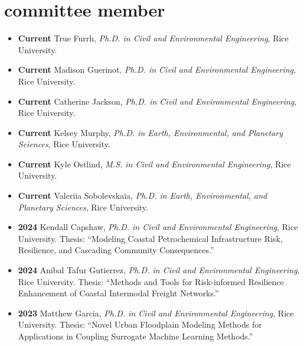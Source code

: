 \documentclass[10pt,oneside]{article}
\begin{document}
\section{committee member}

\mbox{}\vspace{-\dimexpr\baselineskip\relax}

\begin{itemize}[label={}]

  
    \item \textbf{Current} True Furrh, \textit{Ph.D. in Civil and Environmental Engineering}, Rice University. 
  
    \item \textbf{Current} Madison Guerinot, \textit{Ph.D. in Civil and Environmental Engineering}, Rice University. 
  
    \item \textbf{Current} Catherine Jackson, \textit{Ph.D. in Civil and Environmental Engineering}, Rice University. 
  
    \item \textbf{Current} Kelsey Murphy, \textit{Ph.D. in Earth, Environmental, and Planetary Sciences}, Rice University. 
  
    \item \textbf{Current} Kyle Ostlind, \textit{M.S. in Civil and Environmental Engineering}, Rice University. 
  
    \item \textbf{Current} Valeriia Sobolevskaia, \textit{Ph.D. in Earth, Environmental, and Planetary Sciences}, Rice University. 
  
  
  
    \item \textbf{2024} \quad Kendall Capshaw, \textit{Ph.D. in Civil and Environmental Engineering}, Rice University. Thesis: \enquote{Modeling Coastal Petrochemical Infrastructure Risk, Resilience, and Cascading Community Consequences.}
  
    \item \textbf{2024} \quad Anibal Tafur Gutierrez, \textit{Ph.D. in Civil and Environmental Engineering}, Rice University. Thesis: \enquote{Methods and Tools for Risk-informed Resilience Enhancement of Coastal Intermodal Freight Networks.}
  
    \item \textbf{2023} \quad Matthew Garcia, \textit{Ph.D. in Civil and Environmental Engineering}, Rice University. Thesis: \enquote{Novel Urban Floodplain Modeling Methods for Applications in Coupling Surrogate Machine Learning Methods.}
  

\end{itemize}
\end{document}
